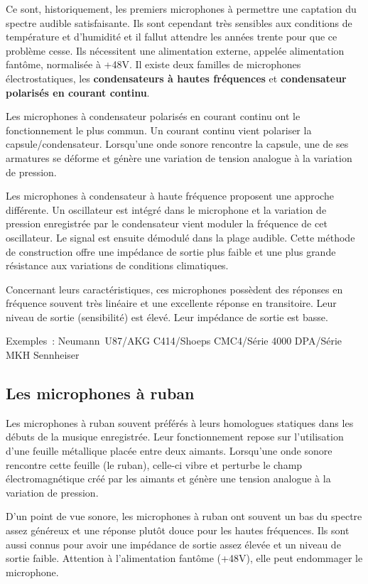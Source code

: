 \documentclass[
]{book}
\begin{document}
Ce sont, historiquement, les premiers microphones à permettre une captation du spectre audible satisfaisante. Ils sont cependant très sensibles aux conditions de température et d'humidité et il fallut attendre les années trente pour que ce problème cesse. Ils nécessitent une alimentation externe, appelée alimentation fantôme, normalisée à +48V. Il existe deux familles de microphones électrostatiques, les \textbf{condensateurs à hautes fréquences} et \textbf{condensateur polarisés en courant continu}.

Les microphones à condensateur polarisés en courant continu ont le fonctionnement le plus commun. Un courant continu vient polariser la capsule/condensateur. Lorsqu'une onde sonore rencontre la capsule, une de ses armatures se déforme et génère une variation de tension analogue à la variation de pression.

Les microphones à condensateur à haute fréquence proposent une approche différente. Un oscillateur est intégré dans le microphone et la variation de pression enregistrée par le condensateur vient moduler la fréquence de cet oscillateur. Le signal est ensuite démodulé dans la plage audible. Cette méthode de construction offre une impédance de sortie plus faible et une plus grande résistance aux variations de conditions climatiques.

Concernant leurs caractéristiques, ces microphones possèdent des réponses en fréquence souvent très linéaire et une excellente réponse en transitoire. Leur niveau de sortie (sensibilité) est élevé. Leur impédance de sortie est basse.

Exemples~: Neumann~U87/AKG C414/Shoeps CMC4/Série 4000 DPA/Série MKH Sennheiser

\hypertarget{les-microphones-uxe0-ruban}{%
\subsection{Les microphones à ruban}\label{les-microphones-uxe0-ruban}}

Les microphones à ruban souvent préférés à leurs homologues statiques dans les débuts de la musique enregistrée. Leur fonctionnement repose sur l'utilisation d'une feuille métallique placée entre deux aimants. Lorsqu'une onde sonore rencontre cette feuille (le ruban), celle-ci vibre et perturbe le champ électromagnétique créé par les aimants et génère une tension analogue à la variation de pression.

D'un point de vue sonore, les microphones à ruban ont souvent un bas du spectre assez généreux et une réponse plutôt douce pour les hautes fréquences. Ils sont aussi connus pour avoir une impédance de sortie assez élevée et un niveau de sortie faible. Attention à l'alimentation fantôme (+48V), elle peut endommager le microphone.
\end{document}
